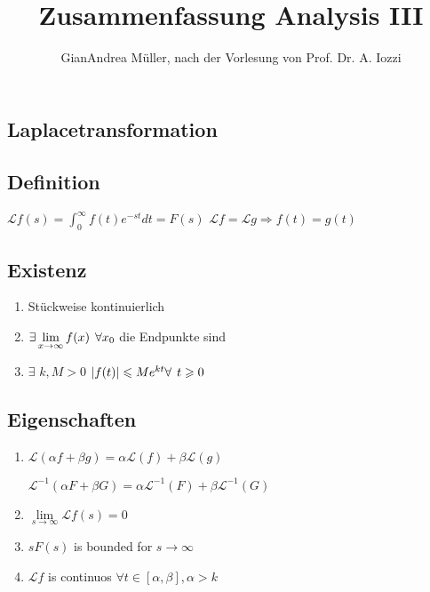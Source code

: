 \documentclass[10pt,a4paper]{scrartcl}
\author{GianAndrea Müller, nach der Vorlesung von Prof. Dr.  A. Iozzi}
\title{Zusammenfassung Analysis III}
\newcommand{\compaqn}{\setlength{\itemsep}{0mm}\setlength{\parskip}{0cm}}%
\renewcommand{\L}{\mathscr{L}}
\begin{document}
\maketitle
\begin{multicols*}{3}
\setcounter{tocdepth}{2}
\tableofcontents
\end{multicols*}
 \clearpage
\begin{multicols*}{3}	%
	\parindent 0pt %
	\setlength{\columnseprule}{0.5pt}	
 	
	\section{Laplacetransformation}
	\subsection{Definition}
	$\L f(s)=\int_0^\infty{f(t)e^{-st}dt=F(s)}$ \hfill $\L f=\L g \Rightarrow f(t)=g(t)$	
	
	\subsection{Existenz}
	
	\begin{enumerate}
	\compaqn	
	\item
	Stückweise kontinuierlich
	\item
	$\exists \lim\limits_{x \rightarrow \infty}{f(x)}\hspace{1ex} \forall x_0$ die Endpunkte sind
	\item
	$\exists$ $k,M>0$ $|f(t)|\leqslant Me^{kt}\forall\hspace{1ex} t\geqslant 0$
	\end{enumerate}
		
	\subsection{Eigenschaften}
	\begin{enumerate}
	\compaqn
	\item
	$\L (\alpha f + \beta g)=\alpha \L (f) + \beta\L (g)$ 
	
	$\L^{-1}(\alpha F + \beta G)=\alpha \L^{-1}(F)+\beta\L^{-1}(G)$
	\item
	$\lim\limits_{s\rightarrow \infty}{\L f(s)} = 0$
	\item
	$sF(s)$ is bounded for $s\rightarrow \infty$
	\item
	$\L f$ is continuos $\forall t \in [\alpha ,\beta],\alpha >k$
	

\end{enumerate}
\end{multicols*}
\end{document}
